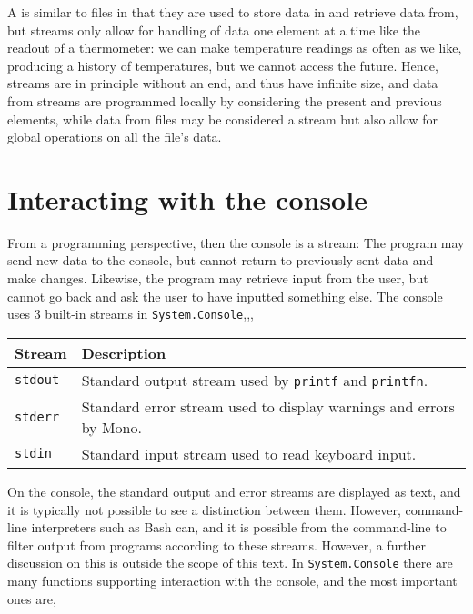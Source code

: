 A  is similar to files in that they are used to store data in and retrieve data from, but streams only allow for handling of data one element at a time like the readout of a thermometer: we can make temperature readings as often as we like, producing a history of temperatures, but we cannot access the future. Hence, streams are in principle without an end, and thus have infinite size, and data from streams are programmed locally by considering the present and previous elements, while data from files may be considered a stream but also allow for global operations on all the file's data.

\section{Interacting with the console}
From a programming perspective, then the console is a stream: The program may send new data to the console, but cannot return to previously sent data and make changes. Likewise, the program may retrieve input from the user, but cannot go back and ask the user to have inputted something else. The console uses 3 built-in streams in \lstinline!System.Console!,,,
\begin{center}
  \begin{tabularx}{\linewidth}{|l|X|}
    \hline
    Stream & Description\\
    \hline
    \lstinline{stdout} & Standard output stream used by \lstinline!printf! and \lstinline!printfn!.\\
    \hline
    \lstinline{stderr} & Standard error stream used to display warnings and errors by Mono.\\
    \hline
    \lstinline{stdin} & Standard input stream used to read keyboard input.\\
    \hline
  \end{tabularx}
\end{center}
On the console, the standard output and error streams are displayed as text, and it is typically not possible to see a distinction between them. However, command-line interpreters such as Bash can, and it is possible from the command-line to filter output from programs according to these streams. However, a further discussion on this is outside the scope of this text. In \lstinline!System.Console! there are many functions supporting interaction with the console, and the most important ones are,
